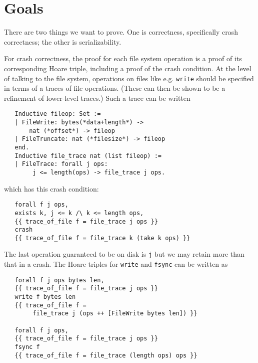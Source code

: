 \documentclass[11pt, twocolumn, letterpaper]{article}
\newcommand{\coqsize}{\scriptsize}
\begin{document}
\section{Goals}

%

There are two things we want to prove.
One is correctness, specifically crash correctness; the other is
serializability.

For crash correctness, the proof for each file system operation is a
proof of its corresponding Hoare triple, including a proof of the
crash condition.
At the level of talking to the file system,
operations on files like e.g. \texttt{write} should be specified in
terms of a traces of file operations.
(These can then be shown to be a refinement of lower-level traces.)
Such a trace can be written

{\coqsize
\begin{verbatim}
   Inductive fileop: Set :=
   | FileWrite: bytes(*data+length*) ->
       nat (*offset*) -> fileop
   | FileTruncate: nat (*filesize*) -> fileop
   end.
   Inductive file_trace nat (list fileop) :=
   | FileTrace: forall j ops:
        j <= length(ops) -> file_trace j ops.
\end{verbatim}
}
which has this crash condition:
{\coqsize
\begin{verbatim}
   forall f j ops,
   exists k, j <= k /\ k <= length ops,
   {{ trace_of_file f = file_trace j ops }}
   crash
   {{ trace_of_file f = file_trace k (take k ops) }}
\end{verbatim}
}

The last operation guaranteed to be on disk is \texttt{j}
but we may retain more than that in a crash.
The Hoare triples for \texttt{write} and \texttt{fsync} can be written
as

{\coqsize
\begin{verbatim}
   forall f j ops bytes len,
   {{ trace_of_file f = file_trace j ops }}
   write f bytes len
   {{ trace_of_file f =
        file_trace j (ops ++ [FileWrite bytes len]) }}

   forall f j ops,
   {{ trace_of_file f = file_trace j ops }}
   fsync f
   {{ trace_of_file f = file_trace (length ops) ops }}
\end{verbatim}
}
\end{document}
